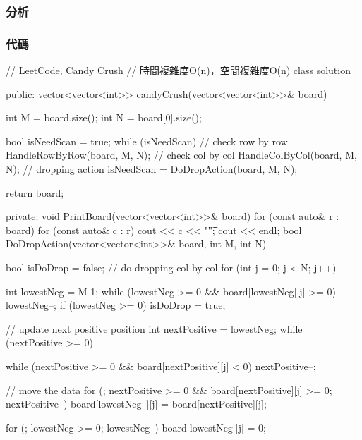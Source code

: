 \subsubsection{分析}

\subsubsection{代碼}
\begin{Code}
// LeetCode, Candy Crush
// 時間複雜度O(n)，空間複雜度O(n)
class solution{
public:
    vector<vector<int>> candyCrush(vector<vector<int>>& board) {
        int M = board.size();
        int N = board[0].size();

        bool isNeedScan = true;
        while (isNeedScan)
        {
            // check row by row
            HandleRowByRow(board, M, N);
            // check col by col
            HandleColByCol(board, M, N);
            // dropping action
            isNeedScan = DoDropAction(board, M, N);
        }

        return board;
    }
private:
    void PrintBoard(vector<vector<int>>& board)
    {
        for (const auto& r : board)
        {
            for (const auto& c : r)
                cout << c << "\t";
            cout << endl;
        }
    }
    bool DoDropAction(vector<vector<int>>& board, int M, int N)
    {
        bool isDoDrop = false;
        // do dropping col by col
        for (int j = 0; j < N; j++)
        {
            int lowestNeg = M-1;
            while (lowestNeg >= 0 && board[lowestNeg][j] >= 0) lowestNeg--;
            if (lowestNeg >= 0) isDoDrop = true;

            // update next positive position
            int nextPositive = lowestNeg;
            while (nextPositive >= 0)
            {
                while (nextPositive >= 0 && board[nextPositive][j] < 0) nextPositive--;
                
                // move the data
                for (; nextPositive >= 0 && board[nextPositive][j] >= 0; nextPositive--)
                    board[lowestNeg--][j] = board[nextPositive][j];
            }
            for (; lowestNeg >= 0; lowestNeg--)
                board[lowestNeg][j] = 0;
        }
        
}}
\end{Code}
